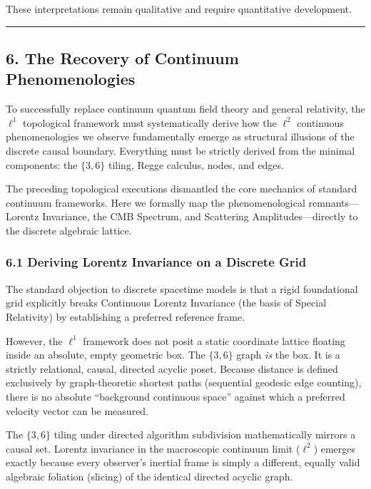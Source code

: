 \documentclass[
]{article}
\begin{document}
These interpretations remain qualitative and require quantitative
development.

\begin{center}\rule{0.5\linewidth}{0.5pt}\end{center}

\hypertarget{the-recovery-of-continuum-phenomenologies}{%
\subsection{6. The Recovery of Continuum
Phenomenologies}\label{the-recovery-of-continuum-phenomenologies}}

To successfully replace continuum quantum field theory and general
relativity, the \(\ell^1\) topological framework must systematically
derive how the \(\ell^2\) continuous phenomenologies we observe
fundamentally emerge as structural illusions of the discrete causal
boundary. Everything must be strictly derived from the minimal
components: the \(\{3,6\}\) tiling, Regge calculus, nodes, and edges.

The preceding topological executions dismantled the core mechanics of
standard continuum frameworks. Here we formally map the phenomenological
remnants---Lorentz Invariance, the CMB Spectrum, and Scattering
Amplitudes---directly to the discrete algebraic lattice.

\hypertarget{deriving-lorentz-invariance-on-a-discrete-grid}{%
\subsubsection{6.1 Deriving Lorentz Invariance on a Discrete
Grid}\label{deriving-lorentz-invariance-on-a-discrete-grid}}

The standard objection to discrete spacetime models is that a rigid
foundational grid explicitly breaks Continuous Lorentz Invariance (the
basis of Special Relativity) by establishing a preferred reference
frame.

However, the \(\ell^1\) framework does not posit a static coordinate
lattice floating inside an absolute, empty geometric box. The
\(\{3,6\}\) graph \emph{is} the box. It is a strictly relational,
causal, directed acyclic poset. Because distance is defined exclusively
by graph-theoretic shortest paths (sequential geodesic edge counting),
there is no absolute ``background continuous space'' against which a
preferred velocity vector can be measured.

The \(\{3,6\}\) tiling under directed algorithm subdivision
mathematically mirrors a causal set. Lorentz invariance in the
macroscopic continuum limit (\(\ell^2\)) emerges exactly because every
observer's inertial frame is simply a different, equally valid algebraic
foliation (slicing) of the identical directed acyclic graph.
\end{document}
